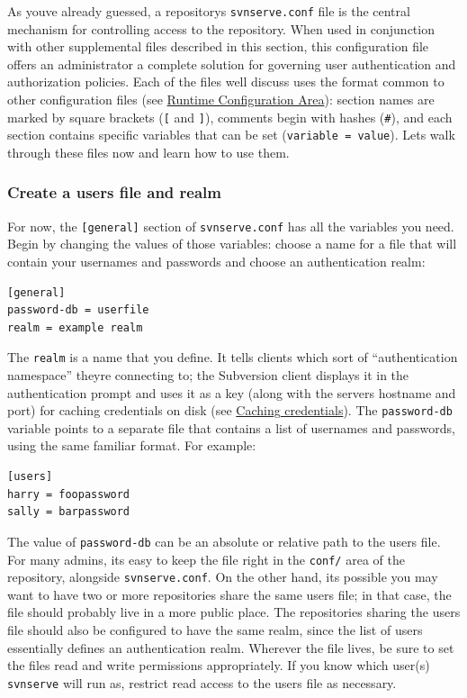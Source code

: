 As you\textquotesingle ve already guessed, a
repository\textquotesingle s \texttt{svnserve.conf} file is the central
mechanism for controlling access to the repository. When used in
conjunction with other supplemental files described in this section,
this configuration file offers an administrator a complete solution for
governing user authentication and authorization policies. Each of the
files we\textquotesingle ll discuss uses the format common to other
configuration files (see \hyperref[svn.advanced.confarea]{Runtime
Configuration Area}): section names are marked by square brackets
(\texttt{{[}} and \texttt{{]}}), comments begin with hashes
(\texttt{\#}), and each section contains specific variables that can be
set (\texttt{variable\ =\ value}). Let\textquotesingle s walk through
these files now and learn how to use them.

\subsubsection{Create a users file and
realm}\label{svn.serverconfig.svnserve.auth.users}

For now, the \texttt{{[}general{]}} section of \texttt{svnserve.conf}
has all the variables you need. Begin by changing the values of those
variables: choose a name for a file that will contain your usernames and
passwords and choose an authentication realm:

\begin{verbatim}
[general]
password-db = userfile
realm = example realm
\end{verbatim}

The \texttt{realm} is a name that you define. It tells clients which
sort of ``authentication namespace'' they\textquotesingle re connecting
to; the Subversion client displays it in the authentication prompt and
uses it as a key (along with the server\textquotesingle s hostname and
port) for caching credentials on disk (see
\hyperref[svn.serverconfig.netmodel.credcache]{Caching credentials}).
The \texttt{password-db} variable points to a separate file that
contains a list of usernames and passwords, using the same familiar
format. For example:

\begin{verbatim}
[users]
harry = foopassword
sally = barpassword
\end{verbatim}

The value of \texttt{password-db} can be an absolute or relative path to
the users file. For many admins, it\textquotesingle s easy to keep the
file right in the \texttt{conf/} area of the repository, alongside
\texttt{svnserve.conf}. On the other hand, it\textquotesingle s possible
you may want to have two or more repositories share the same users file;
in that case, the file should probably live in a more public place. The
repositories sharing the users file should also be configured to have
the same realm, since the list of users essentially defines an
authentication realm. Wherever the file lives, be sure to set the
file\textquotesingle s read and write permissions appropriately. If you
know which user(s) \texttt{svnserve} will run as, restrict read access
to the users file as necessary.

